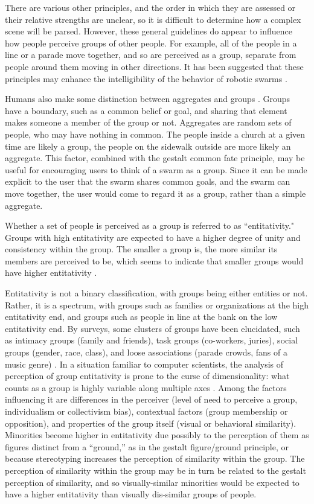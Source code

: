 There are various other principles, and the order in which they are assessed or their relative strengths are unclear, so it is difficult to determine how a complex scene will be parsed. 
However, these general guidelines do appear to influence how people perceive groups of other people. For example, all of the people in a line or a parade move together, and so are perceived as a group, separate from people around them moving in other directions.
It has been suggested that these principles may enhance the intelligibility of the behavior of robotic swarms \citep{nagavalli2018algorithms}. 

Humans also make some distinction between aggregates and groups \citep{wilder1978perceiving}.
Groups have a boundary, such as a common belief or goal, and sharing that element makes someone a member of the group or not. 
Aggregates are random sets of people, who may have nothing in common.
The people inside a church at a given time are likely a group, the people on the sidewalk outside are more likely an aggregate. 
This factor, combined with the gestalt common fate principle, may be useful for encouraging users to think of a swarm as a group. 
Since it can be made explicit to the user that the swarm shares common goals, and the swarm can move together, the user would come to regard it as a group, rather than a simple aggregate. 

Whether a set of people is perceived as a group is referred to as ``entitativity."
Groups with high entitativity are expected to have a higher degree of unity and consistency within the group. 
The smaller a group is, the more similar its members are perceived to be, which seems to indicate that smaller groups would have higher entitativity \citep{stewart2003trust}. 

Entitativity is not a binary classification, with groups being either entities or not. 
Rather, it is a spectrum, with groups such as families or organizations at the high entitativity end, and groups such as people in line at the bank on the low entitativity end. 
By surveys, some clusters of groups have been elucidated, such as intimacy groups (family and friends), task groups (co-workers, juries), social groups (gender, race, class), and loose associations (parade crowds, fans of a music genre) \citep{lickel2001elements}. 
In a situation familiar to computer scientists, the analysis of perception of group entitativity is prone to the curse of dimensionality: what counts as a group is highly variable along multiple axes \citep{lickel2000varieties}.  
Among the factors influencing it are differences in the perceiver (level of need to perceive a group, individualism or collectivism bias), contextual factors (group membership or opposition), and properties of the group itself (visual or behavioral similarity).
Minorities become higher in entitativity due possibly to the perception of them as figures distinct from a ``ground,'' as in the gestalt figure/ground principle, or because stereotyping increases the perception of similarity within the group. 
The perception of similarity within the group may be in turn be related to the gestalt perception of similarity, and so visually-similar minorities would be expected to have a higher entitativity than visually dis-similar groups of people. 
	
